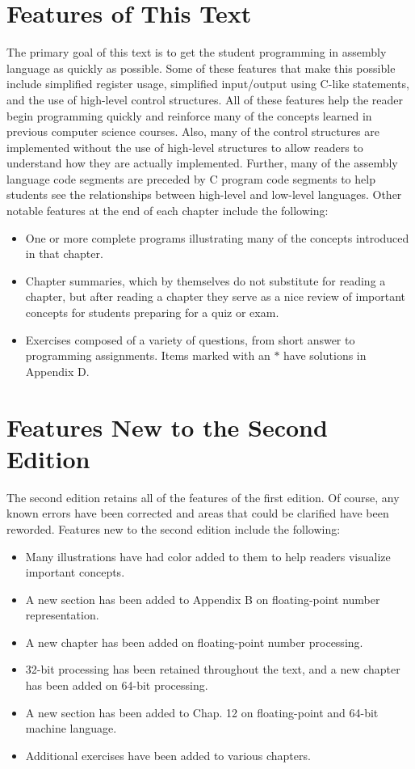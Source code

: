 \documentclass[10pt]{article}
\begin{document}
\section*{Features of This Text}
The primary goal of this text is to get the student programming in assembly language as quickly as possible. Some of these features that make this possible include simplified register usage, simplified input/output using C-like statements, and the use of high-level control structures. All of these features help the reader begin programming quickly and reinforce many of the concepts learned in previous computer science courses. Also, many of the control structures are implemented without the use of high-level structures to allow readers to understand how they are actually implemented. Further, many of the assembly language code segments are preceded by C program code segments to help students see the relationships between high-level and low-level languages. Other notable features at the end of each chapter include the following:

\begin{itemize}
  \item One or more complete programs illustrating many of the concepts introduced in that chapter.
  \item Chapter summaries, which by themselves do not substitute for reading a chapter, but after reading a chapter they serve as a nice review of important concepts for students preparing for a quiz or exam.
  \item Exercises composed of a variety of questions, from short answer to programming assignments. Items marked with an $*$ have solutions in Appendix D.
\end{itemize}

\section*{Features New to the Second Edition}
The second edition retains all of the features of the first edition. Of course, any known errors have been corrected and areas that could be clarified have been reworded. Features new to the second edition include the following:

\begin{itemize}
  \item Many illustrations have had color added to them to help readers visualize important concepts.
  \item A new section has been added to Appendix B on floating-point number representation.
  \item A new chapter has been added on floating-point number processing.
  \item 32-bit processing has been retained throughout the text, and a new chapter has been added on 64-bit processing.
  \item A new section has been added to Chap. 12 on floating-point and 64-bit machine language.
  \item Additional exercises have been added to various chapters.
\end{itemize}
\end{document}
